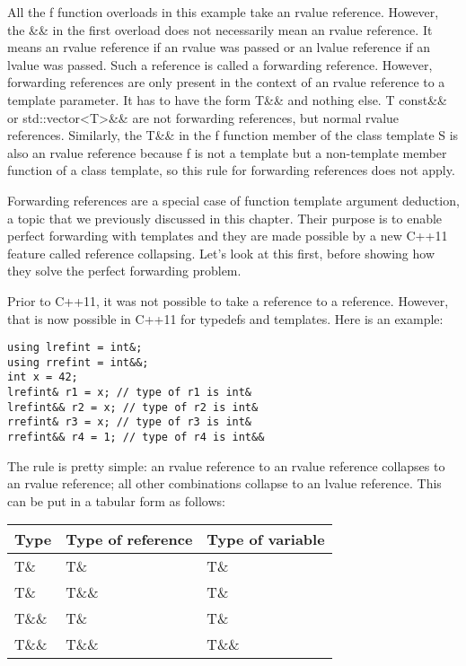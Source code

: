 All the f function overloads in this example take an rvalue reference. However, the \&\& in the first overload does not necessarily mean an rvalue reference. It means an rvalue reference if an rvalue was passed or an lvalue reference if an lvalue was passed. Such a reference is called a forwarding reference. However, forwarding references are only present in the context of an rvalue reference to a template parameter. It has to have the form T\&\& and nothing else. T const\&\& or std::vector<T>\&\& are not forwarding references, but normal rvalue references. Similarly, the T\&\& in the f function member of the class template S is also an rvalue reference because f is not a template but a non-template member function of a class template, so this rule for forwarding references does not apply.

Forwarding references are a special case of function template argument deduction, a topic that we previously discussed in this chapter. Their purpose is to enable perfect forwarding with templates and they are made possible by a new C++11 feature called reference collapsing. Let’s look at this first, before showing how they solve the perfect forwarding problem.

Prior to C++11, it was not possible to take a reference to a reference. However, that is now possible in C++11 for typedefs and templates. Here is an example:

\begin{lstlisting}[style=styleCXX]
using lrefint = int&;
using rrefint = int&&;
int x = 42;
lrefint& r1 = x; // type of r1 is int&
lrefint&& r2 = x; // type of r2 is int&
rrefint& r3 = x; // type of r3 is int&
rrefint&& r4 = 1; // type of r4 is int&&
\end{lstlisting}

The rule is pretty simple: an rvalue reference to an rvalue reference collapses to an rvalue reference; all other combinations collapse to an lvalue reference. This can be put in a tabular form as follows:

\begin{table}[H]
\centering
	\begin{tabular}{|l|l|l|}
		\hline
		\textbf{Type} & \textbf{Type of reference} & \textbf{Type of variable} \\ \hline
		T\&           & T\&                        & T\&                       \\ \hline
		T\&           & T\&\&                      & T\&                       \\ \hline
		T\&\&         & T\&                        & T\&                       \\ \hline
		T\&\&         & T\&\&                      & T\&\&                     \\ \hline
	\end{tabular}
\end{table}

